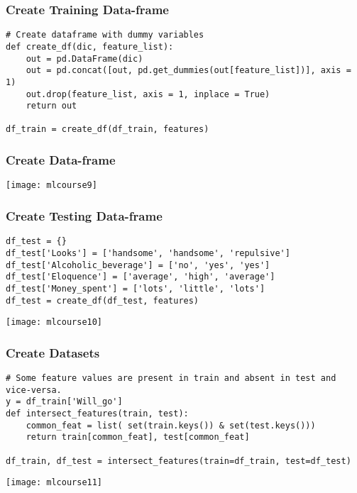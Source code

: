 \begin{frame}[fragile]\frametitle{Create Training Data-frame}	
\begin{lstlisting}
# Create dataframe with dummy variables
def create_df(dic, feature_list):
    out = pd.DataFrame(dic)
    out = pd.concat([out, pd.get_dummies(out[feature_list])], axis = 1)
    out.drop(feature_list, axis = 1, inplace = True)
    return out
	
df_train = create_df(df_train, features)
\end{lstlisting}
\end{frame}

\begin{frame}[fragile]\frametitle{Create Data-frame}	
\begin{center}
\texttt{[image: mlcourse9]}
\end{center}
\end{frame}

\begin{frame}[fragile]\frametitle{Create Testing Data-frame}	
\begin{lstlisting}
df_test = {}
df_test['Looks'] = ['handsome', 'handsome', 'repulsive'] 
df_test['Alcoholic_beverage'] = ['no', 'yes', 'yes']
df_test['Eloquence'] = ['average', 'high', 'average']
df_test['Money_spent'] = ['lots', 'little', 'lots']
df_test = create_df(df_test, features)
\end{lstlisting}

\begin{center}
\texttt{[image: mlcourse10]}
\end{center}
\end{frame}


\begin{frame}[fragile]\frametitle{Create Datasets}	
\begin{lstlisting}
# Some feature values are present in train and absent in test and vice-versa.
y = df_train['Will_go']
def intersect_features(train, test):
    common_feat = list( set(train.keys()) & set(test.keys()))
    return train[common_feat], test[common_feat]

df_train, df_test = intersect_features(train=df_train, test=df_test)
\end{lstlisting}
\begin{center}
\texttt{[image: mlcourse11]}
\end{center}
\end{frame}

